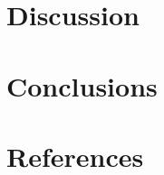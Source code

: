 \documentclass{acm_proc_article-sp}
\begin{document}
\section{Discussion}

\section{Conclusions}

\section{References}

{}  %
\nocite{*}
%
%
\balancecolumns
\end{document}
